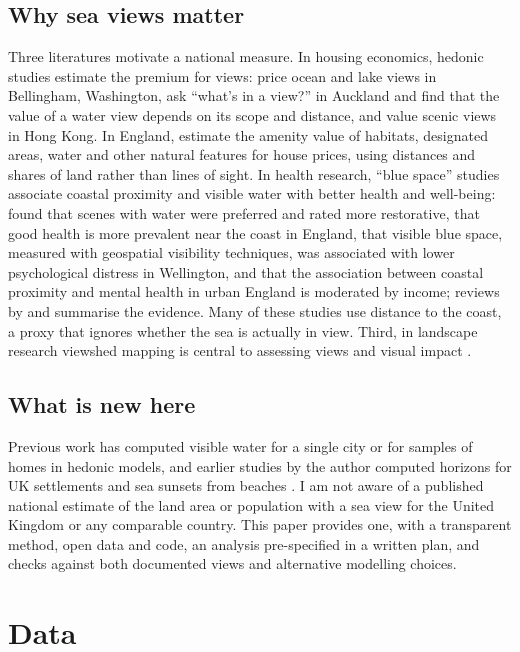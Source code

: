 \documentclass[11pt,a4paper]{article}
\begin{document}
\subsection{Why sea views matter}
Three literatures motivate a national measure. In housing economics, hedonic studies estimate the premium for views: \citet{benson1998} price ocean and lake views in Bellingham, Washington, \citet{bourassa2004} ask ``what's in a view?'' in Auckland and find that the value of a water view depends on its scope and distance, and \citet{jim2009} value scenic views in Hong Kong. In England, \citet{gibbons2014} estimate the amenity value of habitats, designated areas, water and other natural features for house prices, using distances and shares of land rather than lines of sight. In health research, ``blue space'' studies associate coastal proximity and visible water with better health and well-being: \citet{white2010} found that scenes with water were preferred and rated more restorative, \citet{wheeler2012} that good health is more prevalent near the coast in England, \citet{nutsford2016} that visible blue space, measured with geospatial visibility techniques, was associated with lower psychological distress in Wellington, and \citet{garrett2019} that the association between coastal proximity and mental health in urban England is moderated by income; reviews by \citet{volker2011} and \citet{gascon2017} summarise the evidence. Many of these studies use distance to the coast, a proxy that ignores whether the sea is actually in view. Third, in landscape research viewshed mapping is central to assessing views and visual impact \citep{bishop2003}.

\subsection{What is new here}
Previous work has computed visible water for a single city \citep{nutsford2016} or for samples of homes in hedonic models, and earlier studies by the author computed horizons for UK settlements \citep{hotham2026sunless} and sea sunsets from beaches \citep{hotham2026sunsets}. I am not aware of a published national estimate of the land area or population with a sea view for the United Kingdom or any comparable country. This paper provides one, with a transparent method, open data and code, an analysis pre-specified in a written plan, and checks against both documented views and alternative modelling choices.

\section{Data}\label{sec:data}
\end{document}
